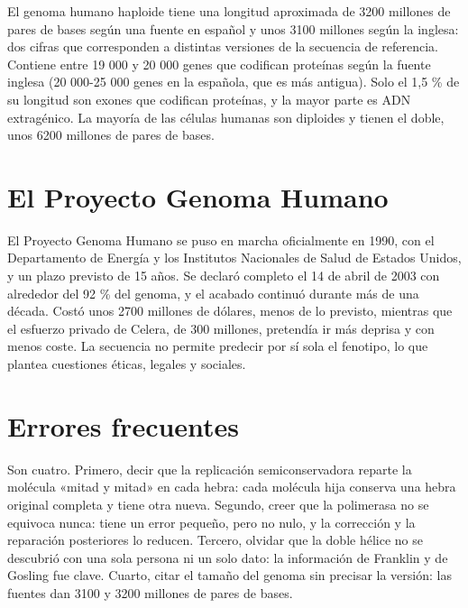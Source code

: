 \documentclass{book}
\begin{document}
El genoma humano haploide tiene una longitud aproximada de 3200 millones de pares de bases según una fuente en español y unos 3100 millones según la inglesa: dos cifras que corresponden a distintas versiones de la secuencia de referencia. Contiene entre 19 000 y 20 000 genes que codifican proteínas según la fuente inglesa (20 000-25 000 genes en la española, que es más antigua). Solo el 1,5 \% de su longitud son exones que codifican proteínas, y la mayor parte es ADN extragénico. La mayoría de las células humanas son diploides y tienen el doble, unos 6200 millones de pares de bases.


\section{El Proyecto Genoma Humano}

El Proyecto Genoma Humano se puso en marcha oficialmente en 1990, con el Departamento de Energía y los Institutos Nacionales de Salud de Estados Unidos, y un plazo previsto de 15 años. Se declaró completo el 14 de abril de 2003 con alrededor del 92 \% del genoma, y el acabado continuó durante más de una década. Costó unos 2700 millones de dólares, menos de lo previsto, mientras que el esfuerzo privado de Celera, de 300 millones, pretendía ir más deprisa y con menos coste. La secuencia no permite predecir por sí sola el fenotipo, lo que plantea cuestiones éticas, legales y sociales.


\section{Errores frecuentes}

Son cuatro. Primero, decir que la replicación semiconservadora reparte la molécula «mitad y mitad» en cada hebra: cada molécula hija conserva una hebra original completa y tiene otra nueva. Segundo, creer que la polimerasa no se equivoca nunca: tiene un error pequeño, pero no nulo, y la corrección y la reparación posteriores lo reducen. Tercero, olvidar que la doble hélice no se descubrió con una sola persona ni un solo dato: la información de Franklin y de Gosling fue clave. Cuarto, citar el tamaño del genoma sin precisar la versión: las fuentes dan 3100 y 3200 millones de pares de bases.
\end{document}
